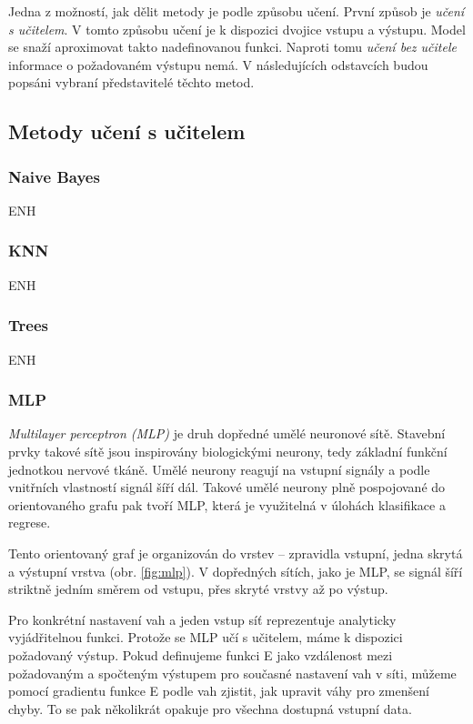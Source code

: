 \documentclass[thesis=M,czech]{FITthesis}[2012/06/26]
\begin{document}

Jedna z možností, jak dělit metody je podle způsobu učení. První způsob je \textit{učení s učitelem}. V tomto způsobu učení je k dispozici dvojice vstupu a výstupu. Model se snaží aproximovat takto nadefinovanou funkci. Naproti tomu \textit{učení bez učitele} informace o požadovaném výstupu nemá. V následujících odstavcích budou popsáni vybraní představitelé těchto metod.\cite{eurokomise}

 \subsection{Metody učení s učitelem}
 \subsubsection*{Naive Bayes}
 ENH
 \subsubsection*{KNN}
 ENH
  \subsubsection*{Trees}
   ENH
   
  \subsubsection*{MLP}
    \textit{Multilayer perceptron (MLP)} je druh dopředné umělé neuronové sítě.
Stavební prvky takové sítě jsou inspirovány biologickými neurony, tedy základní funkční jednotkou nervové tkáně. Umělé neurony reagují na vstupní signály a podle vnitřních vlastností signál šíří dál. Takové umělé neurony plně pospojované do orientovaného grafu pak tvoří MLP, která je využitelná v úlohách klasifikace a regrese. 

Tento orientovaný graf je organizován do vrstev -- zpravidla vstupní, jedna skrytá a výstupní vrstva (obr. \ref{fig:mlp}). V dopředných sítích, jako je MLP, se signál šíří striktně jedním směrem od vstupu, přes skryté vrstvy až po výstup. 

Pro konkrétní nastavení vah a jeden vstup síť reprezentuje analyticky vyjádřitelnou funkci. Protože se MLP učí s učitelem, máme k dispozici požadovaný výstup. Pokud definujeme funkci E jako vzdálenost mezi požadovaným a spočteným výstupem pro současné nastavení vah v síti, můžeme pomocí gradientu funkce E podle vah zjistit, jak upravit váhy pro zmenšení chyby. To se pak několikrát opakuje pro všechna dostupná vstupní data. 
\end{document}
